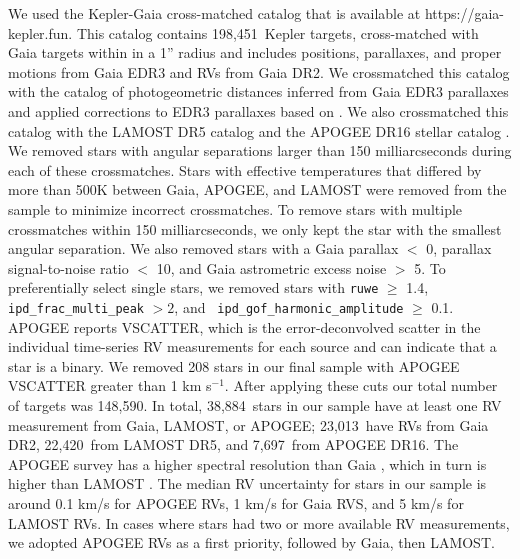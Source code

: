 \documentclass[]{aastex631}
\newcommand{\kms}{km s$^{-1}$}
\newcommand{\nstars}{148,590}
\newcommand{\ngaia}{23,013}
\newcommand{\nlamost}{22,420}
\newcommand{\napogee}{7,697}
\newcommand{\nrv}{38,884}
\newcommand{\nfun}{198,451}
\begin{document}
We used the Kepler-Gaia cross-matched catalog that is available at
https://gaia-kepler.fun.
This catalog contains \nfun\ Kepler targets, cross-matched with Gaia targets
within in a 1'' radius and includes positions, parallaxes, and proper motions
from Gaia EDR3 and RVs from Gaia DR2.
We crossmatched this catalog with the catalog of photogeometric
distances inferred from Gaia EDR3 parallaxes \citep{bailer-jones2021} and
applied corrections to EDR3 parallaxes based on \citet{lindegren2021b}.
We also crossmatched this catalog with the LAMOST DR5 catalog and the APOGEE
DR16 stellar catalog \citep{cui2012, apogee_dr16, xiang2019}.
We removed stars with angular separations larger than 150 milliarcseconds
during each of these crossmatches.
Stars with effective temperatures that differed by more than 500K between
Gaia, APOGEE, and LAMOST were removed from the sample to minimize incorrect
crossmatches.
To remove stars with multiple crossmatches within 150 milliarcseconds, we only
kept the star with the smallest angular separation.
We also removed stars with a Gaia parallax $<$ 0, parallax signal-to-noise
ratio $<$ 10, and Gaia astrometric excess noise $>$ 5.
To preferentially select single stars, we removed stars with {\tt ruwe} $\geq$
1.4, {\tt ipd\_frac\_multi\_peak} $>2$, and {\tt
ipd\_gof\_harmonic\_amplitude} $\geq$ 0.1.
APOGEE reports VSCATTER, which is the error-deconvolved scatter in the
individual time-series RV measurements for each source and can indicate that a
star is a binary.
We removed 208 stars in our final sample with APOGEE VSCATTER greater than 1
\kms.
After applying these cuts our total number of targets was \nstars.
In total, \nrv\ stars in our sample have at least one RV measurement from
Gaia, LAMOST, or APOGEE; \ngaia\ have RVs from Gaia DR2, \nlamost\ from LAMOST
DR5, and \napogee\ from APOGEE DR16.
The APOGEE survey \citep[R $=$ 22,500;][]{apogee} has a higher spectral
resolution than Gaia \citep[R $=$ 11,500;][]{cropper2018}, which in turn is
higher than LAMOST \citep[R $=$ 1,800;][]{zhao2012}.
The median RV uncertainty for stars in our sample is around 0.1 km/s for
APOGEE RVs, 1 km/s for Gaia RVS, and 5 km/s for
LAMOST RVs.
In cases where stars had two or more available RV measurements, we adopted
APOGEE RVs as a first priority, followed by Gaia, then LAMOST.
\end{document}
